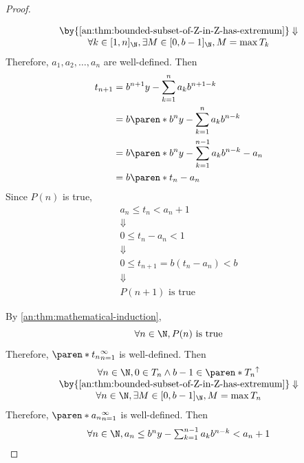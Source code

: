 \begin{proof}
\begin{itemize}
\[\begin{array}{c}
              \by{\Cref{an:thm:bounded-subset-of-Z-in-Z-has-extremum}} \Downarrow              \\
              \forall k \in [1, n]_{\N}, \exists M \in [0, b - 1]_{\N}, M = \max T_{k}
            \end{array}
          \]
          Therefore, $a_{1}, a_{2}, \dots, a_{n}$ are well-defined. Then
          \begin{align*}
            t_{n + 1} & = b^{n + 1}y - \sum_{k = 1}^{n} a_{k}b^{n + 1 - k}               \\
                      & = b\paren*{b^{n}y - \sum_{k = 1}^{n} a_{k}b^{n - k}}             \\
                      & = b\paren*{b^{n}y - \sum_{k = 1}^{n - 1} a_{k}b^{n - k} - a_{n}} \\
                      & = b\paren*{t_{n} - a_{n}}
          \end{align*}
          Since $P(n)$ is true,
          \[
            \begin{array}{c}
              a_{n} \leq t_{n} < a_{n} + 1            \\
              \Downarrow                              \\
              0 \leq t_{n} - a_{n} < 1                \\
              \Downarrow                              \\
              0 \leq t_{n + 1} = b(t_{n} - a_{n}) < b \\
              \Downarrow                              \\
              P(n + 1) \text{ is true}
            \end{array}
          \]
  \end{itemize}
  By \cref{an:thm:mathematical-induction},
  \[
    \forall n \in \N, P(n) \text{ is true}
  \]
  Therefore, $\paren*{t_{n}}_{n = 1}^{\infty}$ is well-defined. Then
  \[
    \begin{array}{c}
      \forall n \in \N, 0 \in T_{n} \land b - 1 \in \paren*{T_{n}}^{\uparrow} \\
      \by{\Cref{an:thm:bounded-subset-of-Z-in-Z-has-extremum}} \Downarrow     \\
      \forall n \in \N, \exists M \in [0, b - 1]_{\N}, M = \max T_{n}
    \end{array}
  \]
  Therefore, $\paren*{a_{n}}_{n = 1}^{\infty}$ is well-defined. Then
  \[
    \begin{array}{c}
      \forall n \in \N, a_{n} \leq b^{n}y - \sum_{k = 1}^{n - 1} a_{k}b^{n - k} < a_{n} + 1 \\

\end{array}\]
\end{proof}
